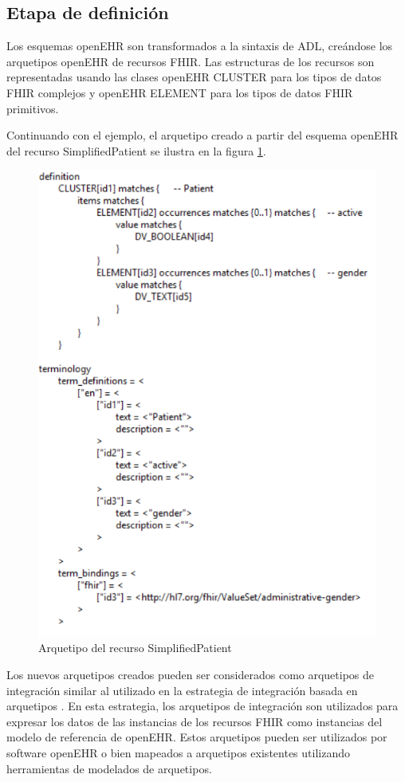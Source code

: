 \subsection{Etapa de definición}

Los esquemas openEHR son transformados a la sintaxis de ADL, creándose los arquetipos openEHR de recursos FHIR. Las estructuras de los recursos son representadas usando las clases openEHR CLUSTER para los tipos de datos FHIR complejos y openEHR ELEMENT para los tipos de datos FHIR primitivos.

Continuando con el ejemplo, el arquetipo creado a partir del esquema openEHR del recurso SimplifiedPatient se ilustra en la figura \ref{fig:definition}.

\begin{figure}
  \includegraphics[scale=0.5]{./images/definition}
  \caption{Arquetipo del recurso SimplifiedPatient}
  \label{fig:definition}
\end{figure}

Los nuevos arquetipos creados pueden ser considerados como arquetipos de integración similar al utilizado en la estrategia de integración basada en arquetipos \cite{openEHRIntegration}. En esta estrategia, los arquetipos de integración son utilizados para expresar los datos de las instancias de los recursos FHIR como instancias del modelo de referencia de openEHR. Estos arquetipos pueden ser utilizados por software openEHR o bien mapeados a arquetipos existentes utilizando herramientas de modelados de arquetipos.

